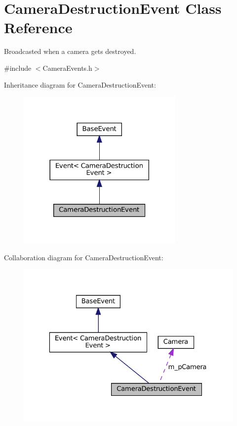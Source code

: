\hypertarget{classCameraDestructionEvent}{}\section{Camera\+Destruction\+Event Class Reference}
\label{classCameraDestructionEvent}


Broadcasted when a camera gets destroyed.  




{\ttfamily \#include $<$Camera\+Events.\+h$>$}



Inheritance diagram for Camera\+Destruction\+Event\+:
\nopagebreak
\begin{figure}[H]
\begin{center}
\leavevmode
\includegraphics[width=230pt]{classCameraDestructionEvent__inherit__graph}
\end{center}
\end{figure}


Collaboration diagram for Camera\+Destruction\+Event\+:
\nopagebreak
\begin{figure}[H]
\begin{center}
\leavevmode
\includegraphics[width=323pt]{classCameraDestructionEvent__coll__graph}
\end{center}
\end{figure}
